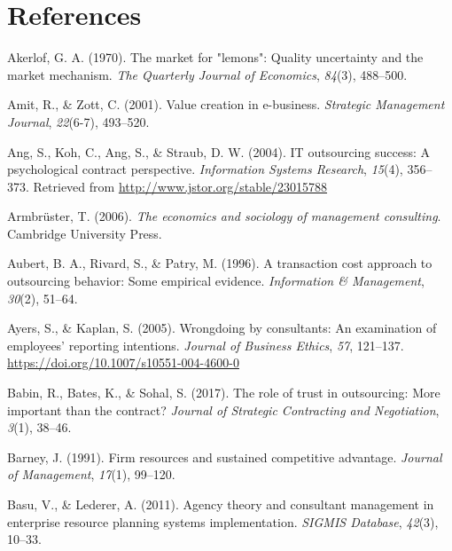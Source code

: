 \documentclass[
  man,floatsintext]{apa6}
\newlength{\cslhangindent}
\newenvironment{CSLReferences}[2] %
 {\begin{list}{}{%
  \setlength{\itemindent}{0pt}
  \setlength{\leftmargin}{0pt}
  \setlength{\parsep}{0pt}
  \ifodd #1
   \setlength{\leftmargin}{\cslhangindent}
   \setlength{\itemindent}{-1\cslhangindent}
  \fi
  \setlength{\itemsep}{#2\baselineskip}}}
 {\end{list}}
\begin{document}
\newpage

\section*{References}\label{references}

\label{refs}
\begin{CSLReferences}{1}{0}
Akerlof, G. A. (1970). The market for "lemons": Quality uncertainty and the market mechanism. \emph{The Quarterly Journal of Economics}, \emph{84}(3), 488--500.

Amit, R., \& Zott, C. (2001). Value creation in e-business. \emph{Strategic Management Journal}, \emph{22}(6-7), 493--520.

Ang, S., Koh, C., Ang, S., \& Straub, D. W. (2004). IT outsourcing success: A psychological contract perspective. \emph{Information Systems Research}, \emph{15}(4), 356--373. Retrieved from \url{http://www.jstor.org/stable/23015788}

Armbrüster, T. (2006). \emph{The economics and sociology of management consulting}. Cambridge University Press.

Aubert, B. A., Rivard, S., \& Patry, M. (1996). A transaction cost approach to outsourcing behavior: Some empirical evidence. \emph{Information \& Management}, \emph{30}(2), 51--64.

Ayers, S., \& Kaplan, S. (2005). Wrongdoing by consultants: An examination of employees' reporting intentions. \emph{Journal of Business Ethics}, \emph{57}, 121--137. \url{https://doi.org/10.1007/s10551-004-4600-0}

Babin, R., Bates, K., \& Sohal, S. (2017). The role of trust in outsourcing: More important than the contract? \emph{Journal of Strategic Contracting and Negotiation}, \emph{3}(1), 38--46.

Barney, J. (1991). Firm resources and sustained competitive advantage. \emph{Journal of Management}, \emph{17}(1), 99--120.

Basu, V., \& Lederer, A. (2011). Agency theory and consultant management in enterprise resource planning systems implementation. \emph{SIGMIS Database}, \emph{42}(3), 10--33.


\end{CSLReferences}
\end{document}
